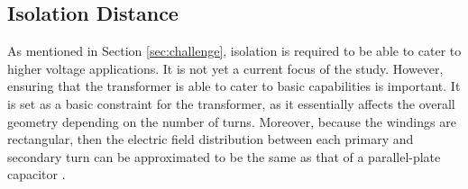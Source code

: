 




\subsection{Isolation Distance}
As mentioned in Section \ref{sec:challenge}, isolation is required to be able to cater to higher voltage applications. It is not yet a current focus of the study. However, ensuring that the transformer is able to cater to basic capabilities is important. It is set as a basic constraint for the transformer, as it essentially affects the overall geometry depending on the number of turns. Moreover, because the windings are rectangular, then the electric field distribution between each primary and secondary turn can be approximated to be the same as that of a parallel-plate capacitor \cite{bahmani2016design}.


